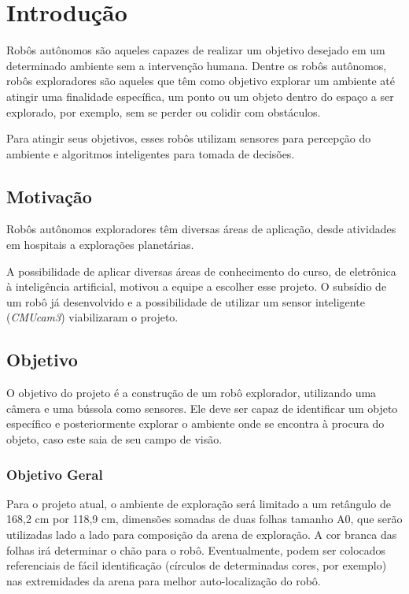 \chapter{Introdução}

Robôs autônomos são aqueles capazes de realizar um objetivo desejado em um determinado ambiente sem a intervenção humana. Dentre os robôs autônomos, robôs exploradores são aqueles que têm como objetivo explorar um ambiente até atingir uma finalidade específica, um ponto ou um objeto dentro do espaço a ser explorado, por exemplo, sem se perder ou colidir com obstáculos.

Para atingir seus objetivos, esses robôs utilizam sensores para percepção do ambiente e algoritmos inteligentes para tomada de decisões.

\section{Motivação}

Robôs autônomos exploradores têm diversas áreas de aplicação, desde atividades em hospitais a explorações planetárias. 

A possibilidade de aplicar diversas áreas de conhecimento do curso, de eletrônica à inteligência artificial, motivou a equipe a escolher esse projeto. O subsídio de um robô já desenvolvido e a possibilidade de utilizar um sensor inteligente (\textit{CMUcam3}) viabilizaram o projeto.

\section{Objetivo}

O objetivo do projeto é a construção de um robô explorador, utilizando uma câmera e uma bússola como sensores. Ele deve ser capaz de identificar um objeto específico e posteriormente explorar o ambiente onde se encontra à procura do objeto, caso este saia de seu campo de visão.

\subsection{Objetivo Geral}

Para o projeto atual, o ambiente de exploração será limitado a um retângulo de 168,2 cm por 118,9 cm, dimensões somadas de duas folhas tamanho A0, que serão utilizadas lado a lado para composição da arena de exploração. A cor branca das folhas irá determinar o chão para o robô. Eventualmente, podem ser colocados referenciais de fácil identificação (círculos de determinadas cores, por exemplo) nas extremidades da arena para melhor auto-localização do robô.


